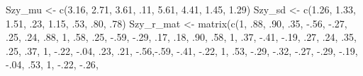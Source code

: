 \documentclass[
  english,
]{book}
\newenvironment{Shaded}{\begin{snugshade}}{\end{snugshade}}
\newcommand{\DecValTok}[1]{\textcolor[rgb]{0.00,0.00,0.81}{#1}}
\newcommand{\FloatTok}[1]{\textcolor[rgb]{0.00,0.00,0.81}{#1}}
\newcommand{\FunctionTok}[1]{\textcolor[rgb]{0.00,0.00,0.00}{#1}}
\newcommand{\NormalTok}[1]{#1}
\newcommand{\OtherTok}[1]{\textcolor[rgb]{0.56,0.35,0.01}{#1}}
\newcommand{\SpecialCharTok}[1]{\textcolor[rgb]{0.00,0.00,0.00}{#1}}
\begin{document}
\begin{Shaded}
\begin{Highlighting}[]
\NormalTok{Szy\_mu }\OtherTok{\textless{}{-}} \FunctionTok{c}\NormalTok{(}\FloatTok{3.16}\NormalTok{, }\FloatTok{2.71}\NormalTok{, }\FloatTok{3.61}\NormalTok{, .}\DecValTok{11}\NormalTok{, }\FloatTok{5.61}\NormalTok{, }\FloatTok{4.41}\NormalTok{, }\FloatTok{1.45}\NormalTok{, }\FloatTok{1.29}\NormalTok{)}
\NormalTok{Szy\_sd }\OtherTok{\textless{}{-}} \FunctionTok{c}\NormalTok{(}\FloatTok{1.26}\NormalTok{, }\FloatTok{1.33}\NormalTok{, }\FloatTok{1.51}\NormalTok{, .}\DecValTok{23}\NormalTok{, }\FloatTok{1.15}\NormalTok{, .}\DecValTok{53}\NormalTok{, .}\DecValTok{80}\NormalTok{, .}\DecValTok{78}\NormalTok{)}
\NormalTok{Szy\_r\_mat }\OtherTok{\textless{}{-}} \FunctionTok{matrix}\NormalTok{(}\FunctionTok{c}\NormalTok{(}\DecValTok{1}\NormalTok{,   .}\DecValTok{88}\NormalTok{, .}\DecValTok{90}\NormalTok{, .}\DecValTok{35}\NormalTok{, }\SpecialCharTok{{-}}\NormalTok{.}\DecValTok{56}\NormalTok{, }\SpecialCharTok{{-}}\NormalTok{.}\DecValTok{27}\NormalTok{, .}\DecValTok{25}\NormalTok{, .}\DecValTok{24}\NormalTok{,}
\NormalTok{                  .}\DecValTok{88}\NormalTok{,  }\DecValTok{1}\NormalTok{,  .}\DecValTok{58}\NormalTok{, .}\DecValTok{25}\NormalTok{, }\SpecialCharTok{{-}}\NormalTok{.}\DecValTok{59}\NormalTok{, }\SpecialCharTok{{-}}\NormalTok{.}\DecValTok{29}\NormalTok{, .}\DecValTok{17}\NormalTok{, .}\DecValTok{18}\NormalTok{,}
\NormalTok{                  .}\DecValTok{90}\NormalTok{, .}\DecValTok{58}\NormalTok{,  }\DecValTok{1}\NormalTok{,  .}\DecValTok{37}\NormalTok{, }\SpecialCharTok{{-}}\NormalTok{.}\DecValTok{41}\NormalTok{, }\SpecialCharTok{{-}}\NormalTok{.}\DecValTok{19}\NormalTok{, .}\DecValTok{27}\NormalTok{, .}\DecValTok{24}\NormalTok{,}
\NormalTok{                  .}\DecValTok{35}\NormalTok{, .}\DecValTok{25}\NormalTok{, .}\DecValTok{37}\NormalTok{,  }\DecValTok{1}\NormalTok{,  }\SpecialCharTok{{-}}\NormalTok{.}\DecValTok{22}\NormalTok{, }\SpecialCharTok{{-}}\NormalTok{.}\DecValTok{04}\NormalTok{, .}\DecValTok{23}\NormalTok{, .}\DecValTok{21}\NormalTok{,}
                 \SpecialCharTok{{-}}\NormalTok{.}\DecValTok{56}\NormalTok{,}\SpecialCharTok{{-}}\NormalTok{.}\DecValTok{59}\NormalTok{, }\SpecialCharTok{{-}}\NormalTok{.}\DecValTok{41}\NormalTok{, }\SpecialCharTok{{-}}\NormalTok{.}\DecValTok{22}\NormalTok{, }\DecValTok{1}\NormalTok{,   .}\DecValTok{53}\NormalTok{, }\SpecialCharTok{{-}}\NormalTok{.}\DecValTok{29}\NormalTok{, }\SpecialCharTok{{-}}\NormalTok{.}\DecValTok{32}\NormalTok{,}
                 \SpecialCharTok{{-}}\NormalTok{.}\DecValTok{27}\NormalTok{, }\SpecialCharTok{{-}}\NormalTok{.}\DecValTok{29}\NormalTok{, }\SpecialCharTok{{-}}\NormalTok{.}\DecValTok{19}\NormalTok{, }\SpecialCharTok{{-}}\NormalTok{.}\DecValTok{04}\NormalTok{, .}\DecValTok{53}\NormalTok{, }\DecValTok{1}\NormalTok{, }\SpecialCharTok{{-}}\NormalTok{.}\DecValTok{22}\NormalTok{, }\SpecialCharTok{{-}}\NormalTok{.}\DecValTok{26}\NormalTok{,}

\end{Highlighting}
\end{Shaded}
\end{document}
